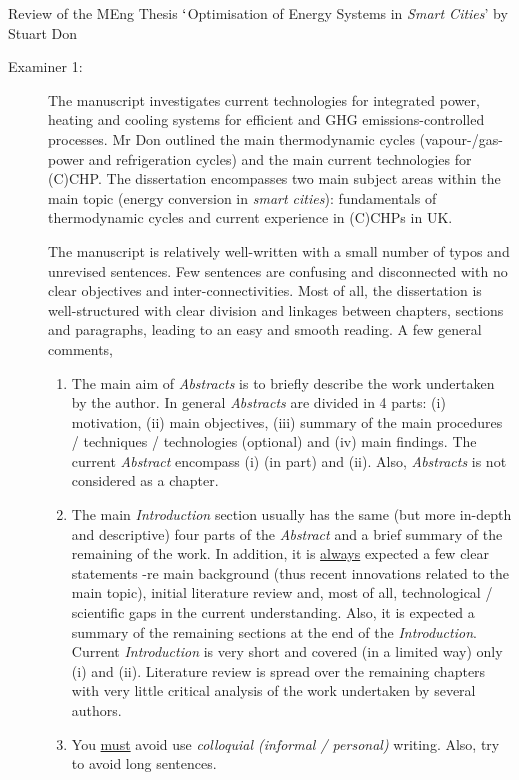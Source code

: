 \documentclass[14pt,twoside]{report}
\begin{document}
\begin{center}
  {\Large Review of the MEng Thesis $\lq$Optimisation of Energy Systems in {\it Smart Cities}' by Stuart Don}
\end{center}
\begin{description}
\item[Examiner 1:] The manuscript investigates current technologies for integrated power, heating and cooling systems for efficient and GHG emissions-controlled processes. Mr Don outlined the main thermodynamic cycles (vapour-/gas-power and refrigeration cycles) and the main current technologies for (C)CHP. The dissertation encompasses two main subject areas within the main topic (energy conversion in {\it smart cities}): fundamentals of thermodynamic cycles and current experience in (C)CHPs in UK. 

The manuscript is relatively well-written with a small number of typos and unrevised sentences. Few sentences are confusing and disconnected with no clear objectives and inter-connectivities. Most of all, the dissertation is well-structured with clear division and linkages between chapters, sections and paragraphs, leading to an easy and smooth reading. A few general comments,
\begin{enumerate}
%
\item The main aim of {\it Abstracts} is to briefly describe the work undertaken by the author. In general {\it Abstracts} are divided in 4 parts: (i) motivation, (ii) main objectives, (iii) summary of the main procedures / techniques / technologies (optional) and (iv) main findings. The current {\it Abstract} encompass (i) (in part) and (ii). Also, {\it Abstracts} is not considered as a chapter.
%
\item The main {\it Introduction} section usually has the same (but more in-depth and descriptive) four parts of the {\it Abstract} and a brief summary of the remaining of the work. In addition, it is \underline{always} expected a few clear statements -re main background (thus recent innovations related to the main topic), initial literature review and, most of all, technological / scientific gaps in the current understanding. Also, it is expected a summary of the remaining sections at the end of the {\it Introduction}.  Current {\it Introduction} is very short and covered (in a limited way) only (i) and (ii). Literature review is spread over the remaining chapters with very little critical analysis of the work undertaken by several authors. 
%
\item You \underline{must} avoid use {\it colloquial (informal / personal)} writing. Also, try to avoid long sentences. 

\end{enumerate}
\end{description}
\end{document}
